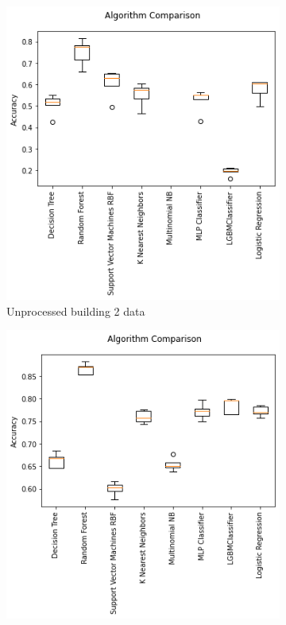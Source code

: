 \documentclass[a4paper,singleside,12pt]{report} %
\begin{document}
			\begin{figure}[!htb]
			  \centering
			  \begin{subfigure}[b]{0.48\linewidth}
			    \includegraphics[width=\linewidth]{./figures/results_model_comparison_unprocessed_building2_data.png}
			     \caption{Unprocessed building 2 data}
			  \end{subfigure}
			  \begin{subfigure}[b]{0.48\linewidth}
			    \includegraphics[width=\linewidth]{./figures/results_model_comparison_preprocessed_building2_data.png}

\end{subfigure}
\end{figure}
\end{document}
